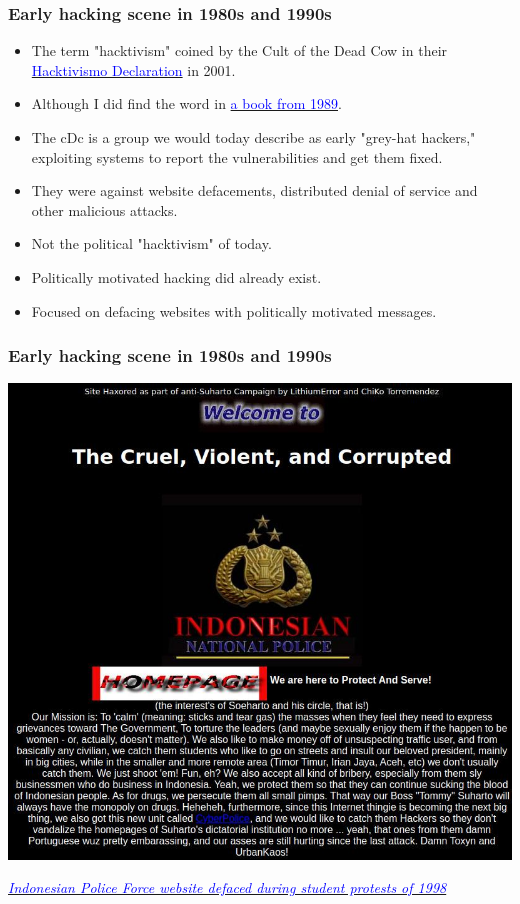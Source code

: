 \documentclass[aspectratio=169,usenames,dvipsnames]{beamer}
\begin{document}
\begin{frame}
  \frametitle{Early hacking scene in 1980s and 1990s}

  \begin{itemize}[<+->]
    \item The term "hacktivism" coined by the Cult of the Dead Cow in their
      \href{https://blog.9while9.com/manifesto-anthology/2001.html}{\textcolor{blue}{Hacktivismo
      Declaration}} in 2001.
    \item Although I did find the word in
      \href{https://en.wikipedia.org/wiki/The_Cuckoo's_Egg_(book)}{\textcolor{blue}{a book from
      1989}}.
    \item The cDc is a group we would today describe as early "grey-hat
      hackers," exploiting systems to report the vulnerabilities and get them
      fixed.
    \item They were against website defacements, distributed denial of service
      and other malicious attacks.
    \item Not the political "hacktivism" of today.
    \item Politically motivated hacking did already exist.
    \item Focused on defacing websites with politically motivated messages.
  \end{itemize}
\end{frame}

\begin{frame}[c]
  \frametitle{Early hacking scene in 1980s and 1990s}

  \centering

  \includegraphics[width=\textwidth,height=0.75\textheight,keepaspectratio]{img/kepolisian_republik.jpg}

  \footnotesize
  \href{https://www.2600.com/hackedphiles/timor011998/indo3/}{\textcolor{blue}{\emph{Indonesian
  Police Force website defaced during student protests of 1998}}}
\end{frame}
\end{document}
